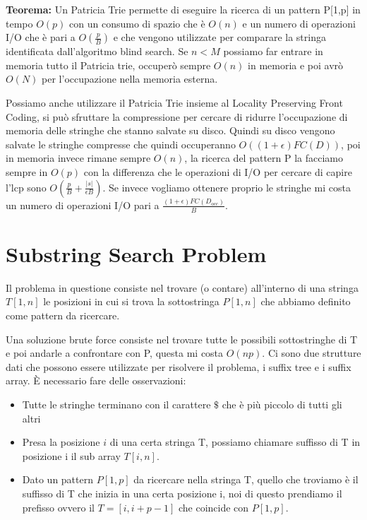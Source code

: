 \documentclass[14pt]{extreport}
\begin{document}
\textbf{Teorema:} Un Patricia Trie permette di eseguire la ricerca di un pattern P[1,p] in tempo $O(p)$ con un consumo di spazio che è $O(n)$ e un numero di operazioni I/O che è pari a $O(\frac{p}{B})$ e che vengono utilizzate per comparare la stringa identificata dall'algoritmo blind search.
Se $n<M$ possiamo far entrare in memoria tutto il Patricia trie, occuperò sempre $O(n)$ in memoria e poi avrò $O(N)$ per l'occupazione nella memoria esterna.

Possiamo anche utilizzare il Patricia Trie insieme al Locality Preserving Front Coding, si può sfruttare la compressione per cercare di ridurre l'occupazione di memoria delle stringhe che stanno salvate su disco.
Quindi su disco vengono salvate le stringhe compresse che quindi occuperanno $O((1+\epsilon)FC(D))$, poi in memoria invece rimane sempre $O(n)$, la ricerca del pattern P la facciamo sempre in $O(p)$ con la differenza che le operazioni di I/O per cercare di capire l'lcp sono $O(\frac{p}{B} + \frac{|s|}{\epsilon B})$. Se invece vogliamo ottenere proprio le stringhe mi costa un numero di operazioni I/O pari a $\frac{(1+\epsilon)FC(D_{occ})}{B}$.

\chapter{Substring Search Problem}

Il problema in questione consiste nel trovare (o contare) all'interno di una stringa $T[1,n]$ le posizioni in cui si trova la sottostringa $P[1,n]$ che abbiamo definito come pattern da ricercare.

Una soluzione brute force consiste nel trovare tutte le possibili sottostringhe di T e poi andarle a confrontare con P, questa mi costa $O(np)$.
Ci sono due strutture dati che possono essere utilizzate per risolvere il problema, i suffix tree e i suffix array.
È necessario fare delle osservazioni:
\begin{itemize}
\item Tutte le stringhe terminano con il carattere $\$$ che è più piccolo di tutti gli altri
\item Presa la posizione $i$ di una certa stringa T, possiamo chiamare suffisso di T in posizione i il sub array $T[i,n]$.
\item Dato un pattern $P[1,p]$ da ricercare nella stringa T, quello che troviamo è il suffisso di T che inizia in una certa posizione i, noi di questo prendiamo il prefisso ovvero il $T=[i,i+p-1]$ che coincide con $P[1,p]$.
\end{itemize}
\end{document}

